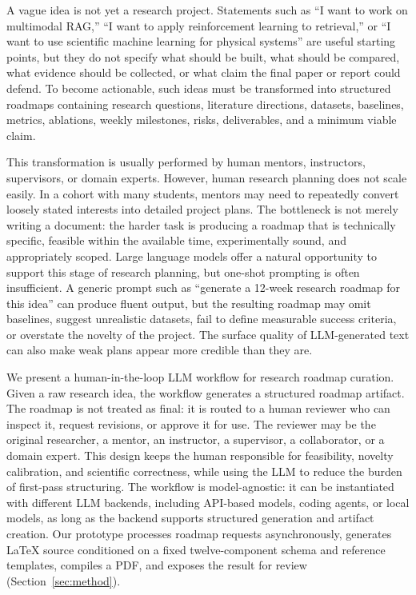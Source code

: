 \documentclass[11pt]{article}
\begin{document}
A vague idea is not yet a research project. Statements such as ``I want to work on multimodal RAG,'' ``I want to apply reinforcement learning to retrieval,'' or ``I want to use scientific machine learning for physical systems'' are useful starting points, but they do not specify what should be built, what should be compared, what evidence should be collected, or what claim the final paper or report could defend. To become actionable, such ideas must be transformed into structured roadmaps containing research questions, literature directions, datasets, baselines, metrics, ablations, weekly milestones, risks, deliverables, and a minimum viable claim.

This transformation is usually performed by human mentors, instructors, supervisors, or domain experts. However, human research planning does not scale easily. In a cohort with many students, mentors may need to repeatedly convert loosely stated interests into detailed project plans. The bottleneck is not merely writing a document: the harder task is producing a roadmap that is technically specific, feasible within the available time, experimentally sound, and appropriately scoped. Large language models offer a natural opportunity to support this stage of research planning, but one-shot prompting is often insufficient. A generic prompt such as ``generate a 12-week research roadmap for this idea'' can produce fluent output, but the resulting roadmap may omit baselines, suggest unrealistic datasets, fail to define measurable success criteria, or overstate the novelty of the project. The surface quality of LLM-generated text can also make weak plans appear more credible than they are.

We present a human-in-the-loop LLM workflow for research roadmap curation. Given a raw research idea, the workflow generates a structured roadmap artifact. The roadmap is not treated as final: it is routed to a human reviewer who can inspect it, request revisions, or approve it for use. The reviewer may be the original researcher, a mentor, an instructor, a supervisor, a collaborator, or a domain expert. This design keeps the human responsible for feasibility, novelty calibration, and scientific correctness, while using the LLM to reduce the burden of first-pass structuring. The workflow is model-agnostic: it can be instantiated with different LLM backends, including API-based models, coding agents, or local models, as long as the backend supports structured generation and artifact creation. Our prototype processes roadmap requests asynchronously, generates LaTeX source conditioned on a fixed twelve-component schema and reference templates, compiles a PDF, and exposes the result for review (Section~\ref{sec:method}).
\end{document}
